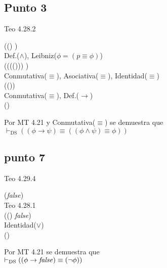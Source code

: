 \documentclass{article}
\begin{document}
\subsection{Punto 3}
\begin{logicenv}{Teo 4.28.2}
    \begin{derivation}
            ((\phi \land \psi) \equiv \phi)\\
        Def.($\land$), Leibniz($\phi = (p \equiv \phi)$)\\
            ((\phi \equiv (\psi \equiv (\phi \lor \psi))) \equiv \phi)\\
        Conmutativa($\equiv$), Asociativa($\equiv$), Identidad($\equiv$)\\
            (\psi \equiv (\phi \lor \psi))\\
        Conmutativa($\equiv$), Def.($\to$)\\
            (\phi \to \psi)
    \end{derivation}
    Por MT 4.21 y Conmutativa($\equiv$) se demuestra que\\
    $\vdash_{\text{DS}} ((\phi \to \psi) \equiv ((\phi \land \psi) \equiv \phi))$
\end{logicenv}

\subsection{punto 7}
\begin{logicenv}{Teo 4.29.4}
    \begin{derivation}
            (\phi \to \textrm{\textit{false}})\\
        Teo 4.28.1\\
            ((\neg \phi) \lor \textrm{\textit{false}})\\
        Identidad($\lor$)\\
            (\neg \phi)
    \end{derivation}
    Por MT 4.21 se demuestra que\\
    $\vdash_{\text{DS}} ((\phi \to \textrm{\textit{false}}) \equiv (\neg \phi))$
\end{logicenv}
\end{document}
